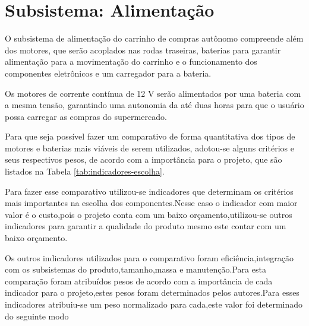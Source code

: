 \section{Subsistema: Alimentação} \label{sec:alimentacao}

\par O subsistema de alimentação do carrinho de compras autônomo compreende além dos  motores, que serão acoplados nas rodas traseiras, baterias para garantir alimentação para a movimentação do carrinho e o funcionamento dos componentes eletrônicos e um carregador para a bateria.
\par Os motores de corrente contínua de 12 V serão alimentados por uma bateria com a mesma tensão, garantindo uma autonomia da até duas horas para que o usuário possa carregar as  compras do supermercado.
\par Para que seja possível fazer um comparativo de forma quantitativa dos tipos de motores e baterias mais viáveis de serem utilizados, adotou-se alguns critérios e seus respectivos pesos, de acordo com a importância para o projeto, que são listados na Tabela \ref{tab:indicadores-escolha}.
\par Para fazer esse comparativo utilizou-se indicadores que determinam os critérios mais importantes na escolha dos componentes.Nesse caso o indicador com maior valor é o custo,pois o projeto conta com um baixo orçamento,utilizou-se outros indicadores para garantir a qualidade do produto mesmo este contar com um baixo orçamento.
\par Os outros indicadores utilizados para o comparativo foram eficiência,integração com os subsistemas do produto,tamanho,massa e manutenção.Para esta comparação foram atribuídos pesos de acordo com a importância de cada indicador para o projeto,estes pesos foram determinados pelos autores.Para esses indicadores atribuiu-se um peso normalizado para cada,este valor foi determinado do seguinte modo 

